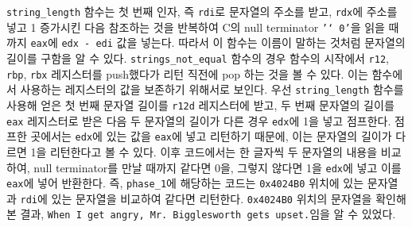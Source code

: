 \documentclass{scrartcl}
\begin{document}
\texttt{string\_length} 함수는 첫 번째 인자, 즉 \texttt{rdi}로 문자열의 주소를
받고, \texttt{rdx}에 주소를 넣고 1 증가시킨 다음 참조하는 것을 반복하여 C의
null terminator \texttt{'\char`\\0'}을 읽을 때까지 \texttt{eax}에 \texttt{edx -
edi} 값을 넣는다. 따라서 이 함수는 이름이 말하는 것처럼 문자열의 길이를 구함을
알 수 있다. \texttt{strings\_not\_equal} 함수의 경우 함수의 시작에서
\texttt{r12}, \texttt{rbp}, \texttt{rbx} 레지스터를 push했다가 리턴 직전에 pop
하는 것을 볼 수 있다. 이는 함수에서 사용하는 레지스터의 값을 보존하기 위해서로
보인다. 우선 \texttt{string\_length} 함수를 사용해 얻은 첫 번째 문자열 길이를
\texttt{r12d} 레지스터에 받고, 두 번째 문자열의 길이를 \texttt{eax} 레지스터로
받은 다음 두 문자열의 길이가 다른 경우 \texttt{edx}에 1을 넣고 점프한다. 점프한
곳에서는 \texttt{edx}에 있는 값을 \texttt{eax}에 넣고 리턴하기 때문에, 이는
문자열의 길이가 다르면 1을 리턴한다고 볼 수 있다. 이후 코드에서는 한 글자씩 두
문자열의 내용을 비교하여, null terminator를 만날 때까지 같다면 0을, 그렇지
않다면 1을 \texttt{edx}에 넣고 이를 \texttt{eax}에 넣어 반환한다. 즉,
\texttt{phase\_1}에 해당하는 코드는 \texttt{0x4024B0} 위치에 있는 문자열과
\texttt{rdi}에 있는 문자열을 비교하여 같다면 리턴한다. \texttt{0x4024B0} 위치의
문자열을 확인해 본 결과, \texttt{When I get angry, Mr. Bigglesworth gets
upset.}임을 알 수 있었다.
\end{document}
